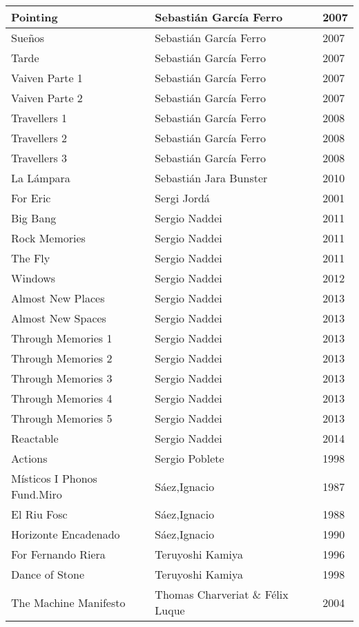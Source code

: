 \begin{center}
\begin{longtable}{| p{} | p{} | p{} |}
Pointing & Sebastián García Ferro & 2007 \\ \hline 
Sueños & Sebastián García Ferro & 2007 \\ \hline 
Tarde & Sebastián García Ferro & 2007 \\ \hline 
Vaiven Parte 1 & Sebastián García Ferro & 2007 \\ \hline 
Vaiven Parte 2 & Sebastián García Ferro & 2007 \\ \hline 
Travellers 1 & Sebastián García Ferro & 2008 \\ \hline 
Travellers 2 & Sebastián García Ferro & 2008 \\ \hline 
Travellers 3 & Sebastián García Ferro & 2008 \\ \hline 
La Lámpara & Sebastián Jara Bunster & 2010 \\ \hline 
For Eric & Sergi Jordá & 2001 \\ \hline 
Big Bang & Sergio Naddei & 2011 \\ \hline 
Rock Memories & Sergio Naddei & 2011 \\ \hline 
The Fly & Sergio Naddei & 2011 \\ \hline 
Windows & Sergio Naddei & 2012 \\ \hline 
Almost New Places & Sergio Naddei & 2013 \\ \hline 
Almost New Spaces & Sergio Naddei & 2013 \\ \hline 
Through Memories 1 & Sergio Naddei & 2013 \\ \hline 
Through Memories 2 & Sergio Naddei & 2013 \\ \hline 
Through Memories 3 & Sergio Naddei & 2013 \\ \hline 
Through Memories 4 & Sergio Naddei & 2013 \\ \hline 
Through Memories 5 & Sergio Naddei & 2013 \\ \hline 
Reactable & Sergio Naddei & 2014 \\ \hline 
Actions & Sergio Poblete & 1998 \\ \hline 
Místicos I Phonos Fund.Miro & Sáez,Ignacio & 1987 \\ \hline 
El Riu Fosc & Sáez,Ignacio & 1988 \\ \hline 
Horizonte Encadenado & Sáez,Ignacio & 1990 \\ \hline 
For Fernando Riera & Teruyoshi Kamiya & 1996 \\ \hline 
Dance of Stone & Teruyoshi Kamiya & 1998 \\ \hline 
The Machine Manifesto & Thomas Charveriat \& Félix Luque & 2004 \\ \hline 

\end{longtable}
\end{center}
